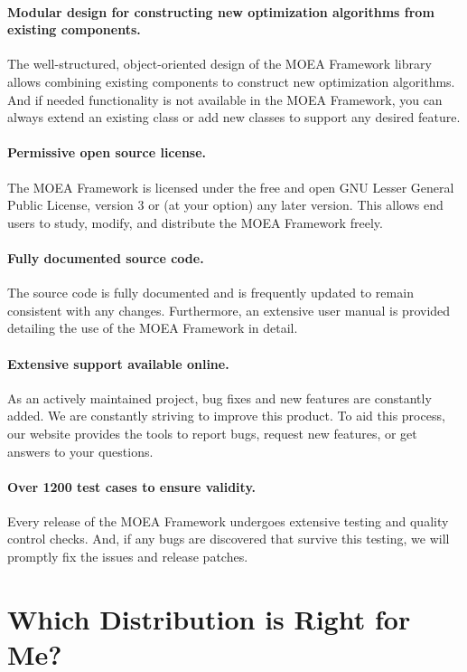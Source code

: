 \paragraph{Modular design for constructing new optimization algorithms from existing components.}  The well-structured, object-oriented design of the MOEA Framework library allows combining existing components to construct new optimization algorithms.  And if needed functionality is not available in the MOEA Framework, you can always extend an existing class or add new classes to support any desired feature.

\paragraph{Permissive open source license.}  The MOEA Framework is licensed under the free and open GNU Lesser General Public License, version 3 or (at your option) any later version.  This allows end users to study, modify, and distribute the MOEA Framework freely.

\paragraph{Fully documented source code.}  The source code is fully documented and is frequently updated to remain consistent with any changes.  Furthermore, an extensive user manual is provided detailing the use of the MOEA Framework in detail.

\paragraph{Extensive support available online.}  As an actively maintained project, bug fixes and new features are constantly added.  We are constantly striving to improve this product.  To aid this process, our website provides the tools to report bugs, request new features, or get answers to your questions.

\paragraph{Over 1200 test cases to ensure validity.}  Every release of the MOEA Framework undergoes extensive testing and quality control checks.  And, if any bugs are discovered that survive this testing, we will promptly fix the issues and release patches.  

\section{Which Distribution is Right for Me?}

